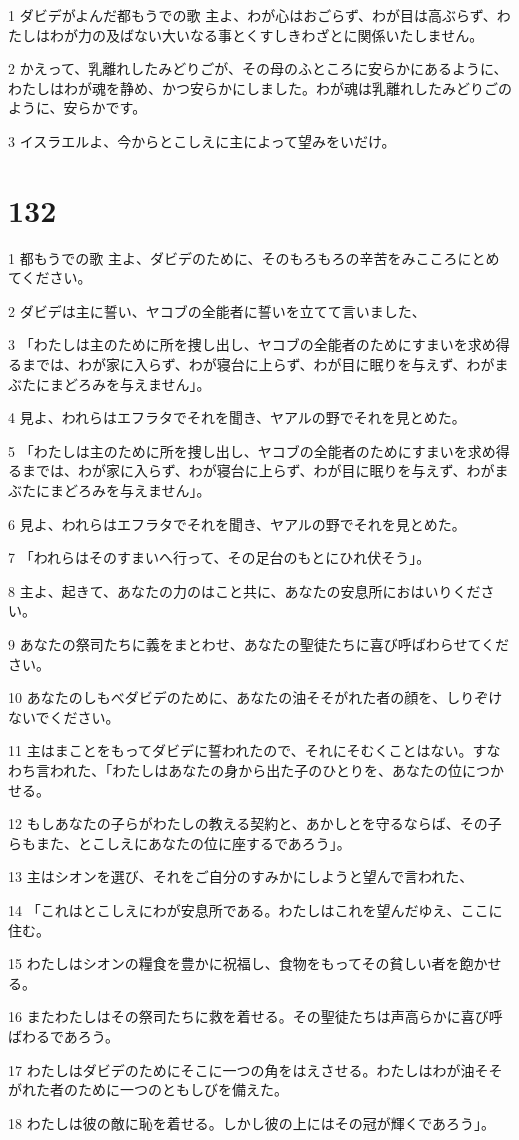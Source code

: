\par 1 ダビデがよんだ都もうでの歌 主よ、わが心はおごらず、わが目は高ぶらず、わたしはわが力の及ばない大いなる事とくすしきわざとに関係いたしません。
\par 2 かえって、乳離れしたみどりごが、その母のふところに安らかにあるように、わたしはわが魂を静め、かつ安らかにしました。わが魂は乳離れしたみどりごのように、安らかです。
\par 3 イスラエルよ、今からとこしえに主によって望みをいだけ。

\chapter{132}

\par 1 都もうでの歌 主よ、ダビデのために、そのもろもろの辛苦をみこころにとめてください。
\par 2 ダビデは主に誓い、ヤコブの全能者に誓いを立てて言いました、
\par 3 「わたしは主のために所を捜し出し、ヤコブの全能者のためにすまいを求め得るまでは、わが家に入らず、わが寝台に上らず、わが目に眠りを与えず、わがまぶたにまどろみを与えません」。
\par 4 見よ、われらはエフラタでそれを聞き、ヤアルの野でそれを見とめた。
\par 5 「わたしは主のために所を捜し出し、ヤコブの全能者のためにすまいを求め得るまでは、わが家に入らず、わが寝台に上らず、わが目に眠りを与えず、わがまぶたにまどろみを与えません」。
\par 6 見よ、われらはエフラタでそれを聞き、ヤアルの野でそれを見とめた。
\par 7 「われらはそのすまいへ行って、その足台のもとにひれ伏そう」。
\par 8 主よ、起きて、あなたの力のはこと共に、あなたの安息所におはいりください。
\par 9 あなたの祭司たちに義をまとわせ、あなたの聖徒たちに喜び呼ばわらせてください。
\par 10 あなたのしもべダビデのために、あなたの油そそがれた者の顔を、しりぞけないでください。
\par 11 主はまことをもってダビデに誓われたので、それにそむくことはない。すなわち言われた、「わたしはあなたの身から出た子のひとりを、あなたの位につかせる。
\par 12 もしあなたの子らがわたしの教える契約と、あかしとを守るならば、その子らもまた、とこしえにあなたの位に座するであろう」。
\par 13 主はシオンを選び、それをご自分のすみかにしようと望んで言われた、
\par 14 「これはとこしえにわが安息所である。わたしはこれを望んだゆえ、ここに住む。
\par 15 わたしはシオンの糧食を豊かに祝福し、食物をもってその貧しい者を飽かせる。
\par 16 またわたしはその祭司たちに救を着せる。その聖徒たちは声高らかに喜び呼ばわるであろう。
\par 17 わたしはダビデのためにそこに一つの角をはえさせる。わたしはわが油そそがれた者のために一つのともしびを備えた。
\par 18 わたしは彼の敵に恥を着せる。しかし彼の上にはその冠が輝くであろう」。

